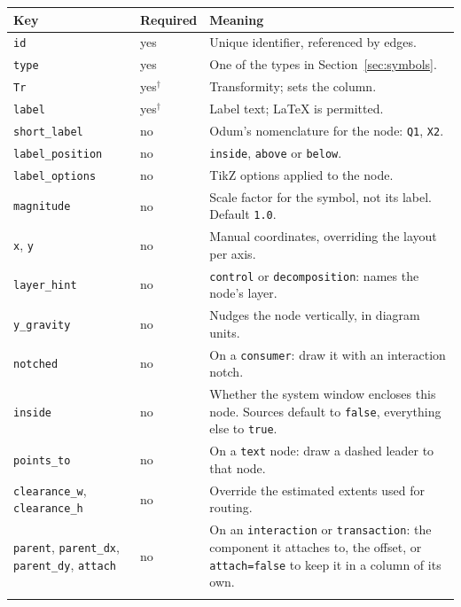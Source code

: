 \documentclass{article}
\begin{document}
\begin{table}[H]
\centering\small
\begin{tabular}{@{}>{\raggedright}p{} l p{}@{}}
\toprule
Key & Required & Meaning \\
\midrule
\texttt{id}             & yes & Unique identifier, referenced by edges. \\
\texttt{type}           & yes & One of the types in Section~\ref{sec:symbols}. \\
\texttt{Tr}             & yes$^\dagger$ & Transformity; sets the column. \\
\texttt{label}          & yes$^\dagger$ & Label text; \LaTeX{} is permitted. \\
\texttt{short\_label}   & no  & Odum's nomenclature for the node: \texttt{Q1}, \texttt{X2}. \\
\texttt{label\_position} & no & \texttt{inside}, \texttt{above} or \texttt{below}. \\
\texttt{label\_options} & no  & TikZ options applied to the node. \\
\texttt{magnitude}      & no  & Scale factor for the symbol, not its label. Default \texttt{1.0}. \\
\texttt{x}, \texttt{y}  & no  & Manual coordinates, overriding the layout per axis. \\
\texttt{layer\_hint}    & no  & \texttt{control} or \texttt{decomposition}: names the node's layer. \\
\texttt{y\_gravity}     & no  & Nudges the node vertically, in diagram units. \\
\texttt{notched}        & no  & On a \texttt{consumer}: draw it with an interaction notch. \\
\texttt{inside}         & no  & Whether the system window encloses this node. Sources
default to \texttt{false}, everything else to \texttt{true}. \\
\texttt{points\_to}     & no  & On a \texttt{text} node: draw a dashed leader to that node. \\
\texttt{clearance\_w}, \texttt{clearance\_h} & no & Override the estimated extents
used for routing. \\
\texttt{parent}, \texttt{parent\_dx}, \texttt{parent\_dy}, \texttt{attach} & no &
On an \texttt{interaction} or \texttt{transaction}: the component it attaches
to, the offset, or \texttt{attach=false} to keep it in a column of its own. \\
\midrule
\multicolumn{3}{@{}l}{\emph{On an exchange (a \texttt{transaction} with a seller
}}
\end{tabular}
\end{table}
\end{document}
